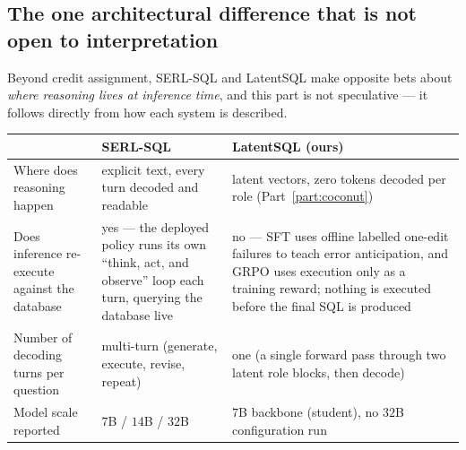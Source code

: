 \documentclass[11pt]{article}
\theoremstyle{definition}
\begin{document}
\subsection{The one architectural difference that is not open to interpretation}

Beyond credit assignment, SERL-SQL and LatentSQL make opposite bets about \emph{where reasoning lives at inference time}, and this part is not speculative --- it follows directly from how each system is described.

\begin{center}
\small
\begin{tabular}{@{}p{}p{}p{}@{}}
\toprule
& \textbf{SERL-SQL} & \textbf{LatentSQL (ours)} \\
\midrule
Where does reasoning happen & explicit text, every turn decoded and
  readable & latent vectors, zero tokens decoded per role (Part~\ref{part:coconut}) \\
Does inference re-execute against the database & yes --- the deployed policy
  runs its own ``think, act, and observe'' loop each turn, querying the
  database live & no --- SFT uses offline labelled one-edit failures to teach
  error anticipation, and GRPO uses execution only as a training reward;
  nothing is executed before the final SQL is produced \\
Number of decoding turns per question & multi-turn (generate, execute,
  revise, repeat) & one (a single forward pass through two latent role blocks,
  then decode) \\
Model scale reported & $7$B / $14$B / $32$B & $7$B backbone (student), no
  $32$B configuration run \\
\bottomrule
\end{tabular}
\end{center}

\begin{center}
\end{center}
\end{document}
